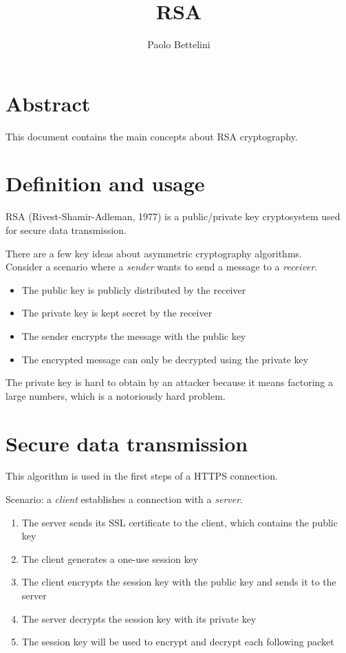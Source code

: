\documentclass{article}
\title{RSA}
\author{Paolo Bettelini}
\date{}
\begin{document}
\maketitle

\section*{Abstract}
This document contains the main concepts about RSA cryptography.

\pagebreak

\tableofcontents
\pagebreak

\section{Definition and usage}


RSA (Rivest-Shamir-Adleman, 1977) is a public/private key cryptosystem used for secure data transmission.

There are a few key ideas about asymmetric cryptography algorithms.
\\
Consider a scenario where a \textit{sender} wants to send a message to a \textit{receiver}.
\begin{itemize}
	\item The public key is publicly distributed by the receiver
	\item The private key is kept secret by the receiver
	\item The sender encrypts the message with the public key
	\item The encrypted message can only be decrypted using the private key
\end{itemize}

The private key is hard to obtain by an attacker because it means factoring a large numbers, which is a notoriously hard problem.

\section{Secure data transmission}

This algorithm is used in the first steps of a HTTPS connection.

Scenario: a \textit{client} establishes a connection with a \textit{server}.
\begin{enumerate}
	\item The server sends its SSL certificate to the client, which contains the public key
	\item The client generates a one-use session key
	\item The client encrypts the session key with the public key and sends it to the server
	\item The server decrypts the session key with its private key
	\item The session key will be used to encrypt and decrypt each following packet
\end{enumerate}
\end{document}
